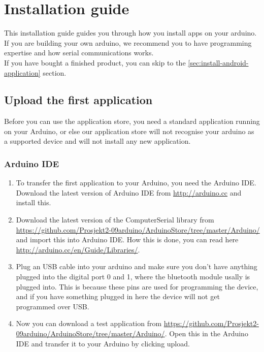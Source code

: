 \chapter{Installation guide}
This installation guide guides you through how you install apps on your arduino. If you are building your own arduino, we recommend you to have programming expertise and how serial communications works.\\

If you have bought a finished product, you can skip to the \ref{sec:install-android-application} section.

	\section{Upload the first application}
	Before you can use the application store, you need a standard application running on your Arduino, or else our application store will not recognise your arduino as a supported device and will not install any new application.
	
		\subsection{Arduino IDE}
		\begin{enumerate}
		\item To transfer the first application to your Arduino, you need the Arduino IDE. Download the latest version of Arduino IDE from \url{http://arduino.cc} and install this.
	
		\item Download the latest version of the ComputerSerial library from \url{https://github.com/Prosjekt2-09arduino/ArduinoStore/tree/master/Arduino/} and import this into Arduino IDE. How this is done, you can read here \url{http://arduino.cc/en/Guide/Libraries/}.
	
		\item Plug an USB cable into your arduino and make sure you don't have anything plugged into the digital port 0 and 1, where the bluetooth module usally is plugged into. This is because these pins are used for programming the device, and if you have something plugged in here the device will not get programmed over USB.
		
		\item Now you can download a test application from \url{https://github.com/Prosjekt2-09arduino/ArduinoStore/tree/master/Arduino/}. Open this in the Arduino IDE and transfer it to your Arduino by clicking upload.
		\end{enumerate}
		
